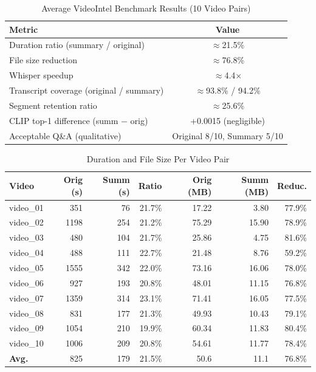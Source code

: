 \documentclass[10pt,conference]{IEEEtran}
\begin{document}
\begin{table}[H]
\centering
\caption{Average VideoIntel Benchmark Results (10 Video Pairs)}
\label{tab:vi_avg}
\begin{tabular}{lc}
\toprule
\textbf{Metric} & \textbf{Value} \\
\midrule
Duration ratio (summary / original)             & $\approx$21.5\%  \\
File size reduction                              & $\approx$76.8\%  \\
Whisper speedup                                  & $\approx$4.4$\times$ \\
Transcript coverage (original / summary)         & $\approx$93.8\% / 94.2\% \\
Segment retention ratio                          & $\approx$25.6\%  \\
CLIP top-1 difference (summ $-$ orig)            & +0.0015 (negligible) \\
Acceptable Q\&A (qualitative)                    & Original 8/10, Summary 5/10 \\
\bottomrule
\end{tabular}
\end{table}

\begin{table}[H]
\centering
\caption{Duration and File Size Per Video Pair}
\label{tab:vi_size}
\begin{tabular}{lrrrrrr}
\toprule
\textbf{Video} & \textbf{Orig (s)} & \textbf{Summ (s)} & \textbf{Ratio} &
\textbf{Orig (MB)} & \textbf{Summ (MB)} & \textbf{Reduc.} \\
\midrule
video\_01 & 351  & 76  & 21.7\% & 17.22 & 3.80  & 77.9\% \\
video\_02 & 1198 & 254 & 21.2\% & 75.29 & 15.90 & 78.9\% \\
video\_03 & 480  & 104 & 21.7\% & 25.86 & 4.75  & 81.6\% \\
video\_04 & 488  & 111 & 22.7\% & 21.48 & 8.76  & 59.2\% \\
video\_05 & 1555 & 342 & 22.0\% & 73.16 & 16.06 & 78.0\% \\
video\_06 & 927  & 193 & 20.8\% & 48.01 & 11.15 & 76.8\% \\
video\_07 & 1359 & 314 & 23.1\% & 71.41 & 16.05 & 77.5\% \\
video\_08 & 831  & 177 & 21.3\% & 49.93 & 10.43 & 79.1\% \\
video\_09 & 1054 & 210 & 19.9\% & 60.34 & 11.83 & 80.4\% \\
video\_10 & 1006 & 209 & 20.8\% & 54.61 & 11.77 & 78.4\% \\
\midrule
\textbf{Avg.} & 825 & 179 & 21.5\% & 50.6 & 11.1 & 76.8\% \\
\bottomrule
\end{tabular}
\end{table}
\end{document}
